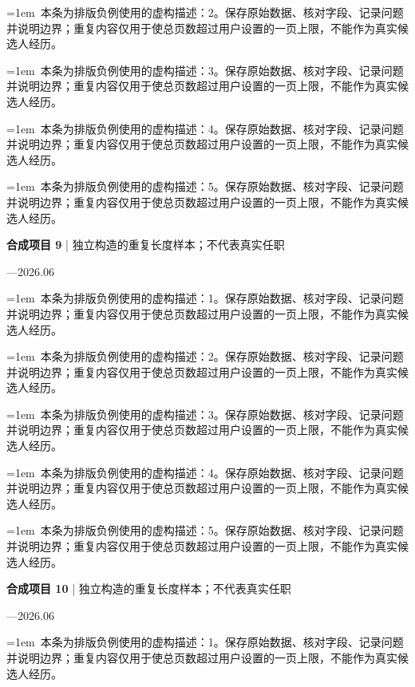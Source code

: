 \documentclass[11pt,a4paper,fontset=fandol]{ctexart}
\begin{document}
\noindent\hangindent=1em\textbullet\ 本条为排版负例使用的虚构描述：2。保存原始数据、核对字段、记录问题并说明边界；重复内容仅用于使总页数超过用户设置的一页上限，不能作为真实候选人经历。\par
\noindent\hangindent=1em\textbullet\ 本条为排版负例使用的虚构描述：3。保存原始数据、核对字段、记录问题并说明边界；重复内容仅用于使总页数超过用户设置的一页上限，不能作为真实候选人经历。\par
\noindent\hangindent=1em\textbullet\ 本条为排版负例使用的虚构描述：4。保存原始数据、核对字段、记录问题并说明边界；重复内容仅用于使总页数超过用户设置的一页上限，不能作为真实候选人经历。\par
\noindent\hangindent=1em\textbullet\ 本条为排版负例使用的虚构描述：5。保存原始数据、核对字段、记录问题并说明边界；重复内容仅用于使总页数超过用户设置的一页上限，不能作为真实候选人经历。\par
\begin{minipage}{\linewidth}
\textbf{合成项目 9} | 独立构造的重复长度样本；不代表真实任职\par
{\small{}—2026.06\par}
\noindent\hangindent=1em\textbullet\ 本条为排版负例使用的虚构描述：1。保存原始数据、核对字段、记录问题并说明边界；重复内容仅用于使总页数超过用户设置的一页上限，不能作为真实候选人经历。\par
\end{minipage}\par
\noindent\hangindent=1em\textbullet\ 本条为排版负例使用的虚构描述：2。保存原始数据、核对字段、记录问题并说明边界；重复内容仅用于使总页数超过用户设置的一页上限，不能作为真实候选人经历。\par
\noindent\hangindent=1em\textbullet\ 本条为排版负例使用的虚构描述：3。保存原始数据、核对字段、记录问题并说明边界；重复内容仅用于使总页数超过用户设置的一页上限，不能作为真实候选人经历。\par
\noindent\hangindent=1em\textbullet\ 本条为排版负例使用的虚构描述：4。保存原始数据、核对字段、记录问题并说明边界；重复内容仅用于使总页数超过用户设置的一页上限，不能作为真实候选人经历。\par
\noindent\hangindent=1em\textbullet\ 本条为排版负例使用的虚构描述：5。保存原始数据、核对字段、记录问题并说明边界；重复内容仅用于使总页数超过用户设置的一页上限，不能作为真实候选人经历。\par
\begin{minipage}{\linewidth}
\textbf{合成项目 10} | 独立构造的重复长度样本；不代表真实任职\par
{\small{}—2026.06\par}
\noindent\hangindent=1em\textbullet\ 本条为排版负例使用的虚构描述：1。保存原始数据、核对字段、记录问题并说明边界；重复内容仅用于使总页数超过用户设置的一页上限，不能作为真实候选人经历。\par
\end{minipage}\par
\end{document}
